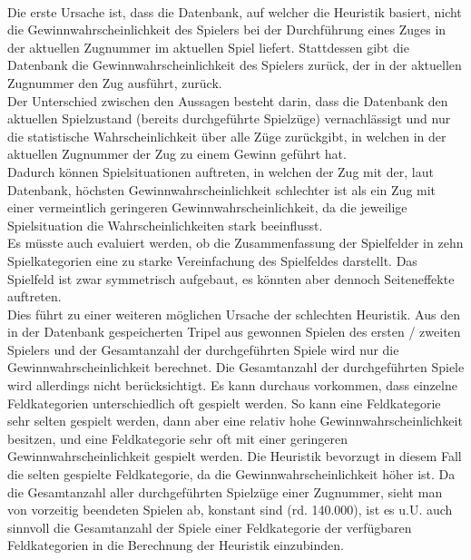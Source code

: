 \\Die erste Ursache ist, dass die Datenbank, auf welcher die Heuristik basiert, nicht die Gewinnwahrscheinlichkeit des Spielers bei der Durchführung eines Zuges in der aktuellen Zugnummer im aktuellen Spiel liefert. Stattdessen gibt die Datenbank die Gewinnwahrscheinlichkeit des Spielers zurück, der in der aktuellen Zugnummer den Zug ausführt, zurück.
\\Der Unterschied zwischen den Aussagen besteht darin, dass die Datenbank den aktuellen Spielzustand (bereits durchgeführte Spielzüge) vernachlässigt und nur die statistische Wahrscheinlichkeit über alle Züge zurückgibt, in welchen in der aktuellen Zugnummer der Zug zu einem Gewinn geführt hat.
\\Dadurch können Spielsituationen auftreten, in welchen der Zug mit der, laut Datenbank, höchsten Gewinnwahrscheinlichkeit schlechter ist als ein Zug mit einer vermeintlich geringeren Gewinnwahrscheinlichkeit, da die jeweilige Spielsituation die Wahrscheinlichkeiten stark beeinflusst.
\vspace{0.5cm}
\\Es müsste auch evaluiert werden, ob die Zusammenfassung der Spielfelder in zehn Spielkategorien eine zu starke Vereinfachung des Spielfeldes darstellt. Das Spielfeld ist zwar symmetrisch aufgebaut, es könnten aber dennoch Seiteneffekte auftreten.
\vspace{0.5cm}
\\Dies führt zu einer weiteren möglichen Ursache der schlechten Heuristik. Aus den in der Datenbank gespeicherten Tripel aus gewonnen Spielen des ersten / zweiten Spielers und der Gesamtanzahl der durchgeführten Spiele wird nur die Gewinnwahrscheinlichkeit berechnet. Die Gesamtanzahl der durchgeführten Spiele wird allerdings nicht berücksichtigt. Es kann durchaus vorkommen, dass einzelne Feldkategorien unterschiedlich oft gespielt werden. So kann eine Feldkategorie sehr selten gespielt werden, dann aber eine relativ hohe Gewinnwahrscheinlichkeit besitzen, und eine Feldkategorie sehr oft mit einer geringeren Gewinnwahrscheinlichkeit gespielt werden. Die Heuristik bevorzugt in diesem Fall die selten gespielte Feldkategorie, da die Gewinnwahrscheinlichkeit höher ist. Da die Gesamtanzahl aller durchgeführten Spielzüge einer Zugnummer, sieht man von vorzeitig beendeten Spielen ab, konstant sind (rd. 140.000), ist es u.U. auch sinnvoll die Gesamtanzahl der Spiele einer Feldkategorie der verfügbaren Feldkategorien in die Berechnung der Heuristik einzubinden.

